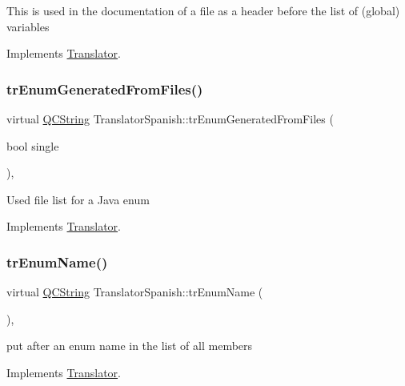 This is used in the documentation of a file as a header before the list of (global) variables 

Implements \mbox{\hyperlink{class_translator}{Translator}}.

\mbox{\label{class_translator_spanish_a9258a8e6f7b26b3b5e37103b497647a8}} 
\subsubsection{\texorpdfstring{trEnumGeneratedFromFiles()}{trEnumGeneratedFromFiles()}}
{\footnotesize\ttfamily virtual \mbox{\hyperlink{class_q_c_string}{Q\+C\+String}} Translator\+Spanish\+::tr\+Enum\+Generated\+From\+Files (\begin{DoxyParamCaption}\item[{bool}]{single }\end{DoxyParamCaption})\hspace{0.3cm}{\ttfamily [inline]}, {\ttfamily [virtual]}}

Used file list for a Java enum 

Implements \mbox{\hyperlink{class_translator}{Translator}}.

\mbox{\label{class_translator_spanish_a006c151159432084521bb52d4027d94e}} 
\subsubsection{\texorpdfstring{trEnumName()}{trEnumName()}}
{\footnotesize\ttfamily virtual \mbox{\hyperlink{class_q_c_string}{Q\+C\+String}} Translator\+Spanish\+::tr\+Enum\+Name (\begin{DoxyParamCaption}{ }\end{DoxyParamCaption})\hspace{0.3cm}{\ttfamily [inline]}, {\ttfamily [virtual]}}

put after an enum name in the list of all members 

Implements \mbox{\hyperlink{class_translator}{Translator}}.

\mbox{\label{class_translator_spanish_abceba785e11146b9a7f304b4f92d2e9d}} 
